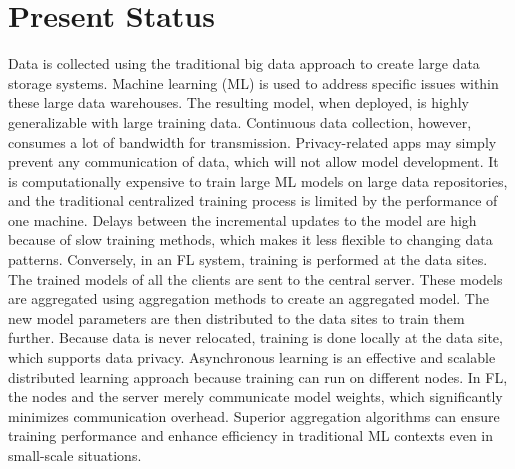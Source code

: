 \section{Present Status}
Data is collected using the traditional big data approach to create large data storage systems. Machine learning (ML) is used to address specific issues within these large data warehouses. The resulting model, when deployed, is highly generalizable with large training data. Continuous data collection, however, consumes a lot of bandwidth for transmission. Privacy-related apps may simply prevent any communication of data, which will not allow model development. It is computationally expensive to train large ML models on large data repositories, and the traditional centralized training process is limited by the performance of one machine. Delays between the incremental updates to the model are high because of slow training methods, which makes it less flexible to changing data patterns. Conversely, in an FL system, training is performed at the data sites. The trained models of all the clients are sent to the central server. These models are aggregated using aggregation methods to create an aggregated model. The new model parameters are then distributed to the data sites to train them further. Because data is never relocated, training is done locally at the data site, which supports data privacy. Asynchronous learning is an effective and scalable distributed learning approach because training can run on different nodes. In FL, the nodes and the server merely communicate model weights, which significantly minimizes communication overhead. Superior aggregation algorithms can ensure training performance and enhance efficiency in traditional ML contexts even in small-scale situations.

